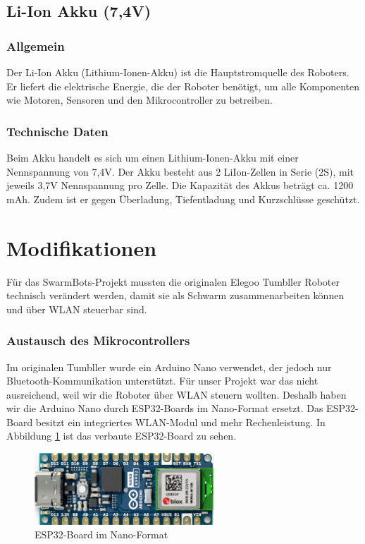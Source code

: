 \subsection{Li-Ion Akku (7,4V)}
%
\subsubsection{Allgemein}
Der Li-Ion Akku (Lithium-Ionen-Akku) ist die Hauptstromquelle des Roboters.
% 
Er liefert die elektrische Energie, die der Roboter benötigt,
um alle Komponenten wie Motoren, Sensoren und den Mikrocontroller zu betreiben.
%
\subsubsection{Technische Daten}
Beim Akku handelt es sich um einen Lithium-Ionen-Akku mit einer Nennspannung von 7,4V.
%
Der Akku besteht aus 2 LiIon-Zellen in Serie (2S), mit jeweils 3,7V Nennspannung pro Zelle.
Die Kapazität des Akkus beträgt ca. 1200 mAh.
%
Zudem ist er gegen Überladung, Tiefentladung und Kurzschlüsse geschützt.
%

\section{Modifikationen}
\label{subsec:hardware_modifikationen}

Für das SwarmBots-Projekt mussten die originalen Elegoo Tumbller Roboter technisch verändert werden, damit sie als Schwarm zusammenarbeiten können und über WLAN steuerbar sind.

\subsubsection{Austausch des Mikrocontrollers}
Im originalen Tumbller wurde ein Arduino Nano verwendet, der jedoch nur Bluetooth-Kommunikation unterstützt.
%
Für unser Projekt war das nicht ausreichend, weil wir die Roboter über WLAN steuern wollten.
%
Deshalb haben wir die Arduino Nano durch ESP32-Boards im Nano-Format ersetzt.
%
Das ESP32-Board besitzt ein integriertes WLAN-Modul und mehr Rechenleistung.
%
In Abbildung \ref{fig:nanoesp32} ist das verbaute ESP32-Board zu sehen.
%
\begin{figure}[H]
    \centering
    \includegraphics[width=0.6\textwidth]{img/Hardware/nanoesp32.png}
    \caption{ESP32-Board im Nano-Format}
    \label{fig:nanoesp32}
\end{figure}

